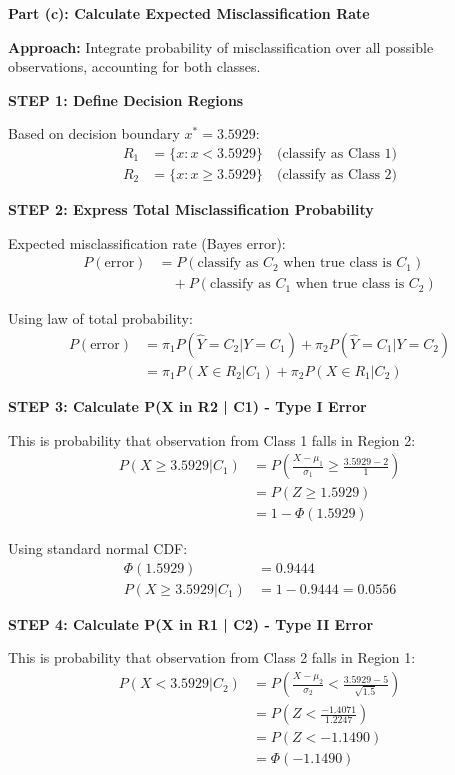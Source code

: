 \documentclass[12pt]{article}
\begin{document}
\begin{solution}

\textbf{Part (c): Calculate Expected Misclassification Rate}

\textbf{Approach:} Integrate probability of misclassification over all possible observations, accounting for both classes.

\textbf{STEP 1: Define Decision Regions}

Based on decision boundary $x^* = 3.5929$:
\begin{align*}
R_1 &= \{x : x < 3.5929\} \quad \text{(classify as Class 1)} \\
R_2 &= \{x : x \geq 3.5929\} \quad \text{(classify as Class 2)}
\end{align*}

\textbf{STEP 2: Express Total Misclassification Probability}

Expected misclassification rate (Bayes error):
\begin{align*}
P(\text{error}) &= P(\text{classify as } C_2 \text{ when true class is } C_1) \\
&\quad + P(\text{classify as } C_1 \text{ when true class is } C_2)
\end{align*}

Using law of total probability:
\begin{align*}
P(\text{error}) &= \pi_1 P(\hat{Y} = C_2 | Y = C_1) + \pi_2 P(\hat{Y} = C_1 | Y = C_2) \\
&= \pi_1 P(X \in R_2 | C_1) + \pi_2 P(X \in R_1 | C_2)
\end{align*}

\textbf{STEP 3: Calculate P(X in R2 | C1) - Type I Error}

This is probability that observation from Class 1 falls in Region 2:
\begin{align*}
P(X \geq 3.5929 | C_1) &= P\left(\frac{X - \mu_1}{\sigma_1} \geq \frac{3.5929 - 2}{1}\right) \\
&= P(Z \geq 1.5929) \\
&= 1 - \Phi(1.5929)
\end{align*}

Using standard normal CDF:
\begin{align*}
\Phi(1.5929) &= 0.9444 \\
P(X \geq 3.5929 | C_1) &= 1 - 0.9444 = 0.0556
\end{align*}

\textbf{STEP 4: Calculate P(X in R1 | C2) - Type II Error}

This is probability that observation from Class 2 falls in Region 1:
\begin{align*}
P(X < 3.5929 | C_2) &= P\left(\frac{X - \mu_2}{\sigma_2} < \frac{3.5929 - 5}{\sqrt{1.5}}\right) \\
&= P\left(Z < \frac{-1.4071}{1.2247}\right) \\
&= P(Z < -1.1490) \\
&= \Phi(-1.1490)
\end{align*}


\end{solution}
\end{document}
